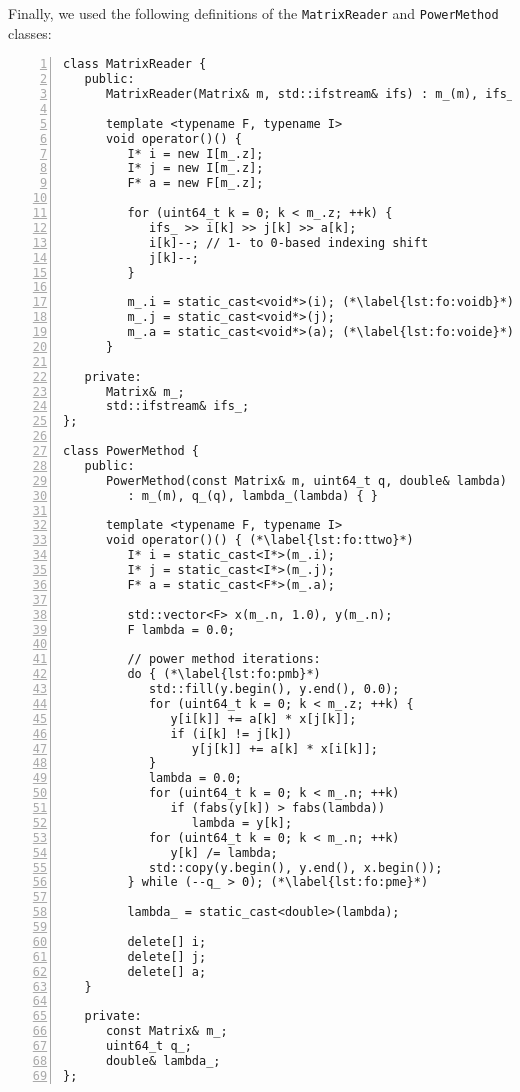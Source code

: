 \documentclass[10pt,a4paper]{article}
\theoremstyle{definition}\newtheorem{problem}{Problem}
\begin{document}
Finally, we used the following definitions of the \texttt{MatrixReader} and \texttt{Power\-Method} classes:
{\small
\begin{lstlisting}[numbers=left,xleftmargin=2em]
class MatrixReader {
   public:
      MatrixReader(Matrix& m, std::ifstream& ifs) : m_(m), ifs_(ifs) { } (*\label{lst:fo:mrcons}*)

      template <typename F, typename I>
      void operator()() {
         I* i = new I[m_.z];
         I* j = new I[m_.z];
         F* a = new F[m_.z];

         for (uint64_t k = 0; k < m_.z; ++k) {
            ifs_ >> i[k] >> j[k] >> a[k];
            i[k]--; // 1- to 0-based indexing shift
            j[k]--;
         }

         m_.i = static_cast<void*>(i); (*\label{lst:fo:voidb}*)
         m_.j = static_cast<void*>(j);
         m_.a = static_cast<void*>(a); (*\label{lst:fo:voide}*)
      }

   private:
      Matrix& m_;
      std::ifstream& ifs_;
};

class PowerMethod {
   public:
      PowerMethod(const Matrix& m, uint64_t q, double& lambda) (*\label{lst:fo:pmcons}*)
         : m_(m), q_(q), lambda_(lambda) { }

      template <typename F, typename I>
      void operator()() { (*\label{lst:fo:ttwo}*)
         I* i = static_cast<I*>(m_.i);
         I* j = static_cast<I*>(m_.j);
         F* a = static_cast<F*>(m_.a);

         std::vector<F> x(m_.n, 1.0), y(m_.n);
         F lambda = 0.0;

         // power method iterations:
         do { (*\label{lst:fo:pmb}*)
            std::fill(y.begin(), y.end(), 0.0);
            for (uint64_t k = 0; k < m_.z; ++k) {
               y[i[k]] += a[k] * x[j[k]];
               if (i[k] != j[k])
                  y[j[k]] += a[k] * x[i[k]];
            }
            lambda = 0.0;
            for (uint64_t k = 0; k < m_.n; ++k)
               if (fabs(y[k]) > fabs(lambda))
                  lambda = y[k];
            for (uint64_t k = 0; k < m_.n; ++k)
               y[k] /= lambda;
            std::copy(y.begin(), y.end(), x.begin());
         } while (--q_ > 0); (*\label{lst:fo:pme}*)

         lambda_ = static_cast<double>(lambda);

         delete[] i;
         delete[] j;
         delete[] a;
   }

   private:
      const Matrix& m_;
      uint64_t q_;
      double& lambda_;
};
\end{lstlisting}}
\end{document}
